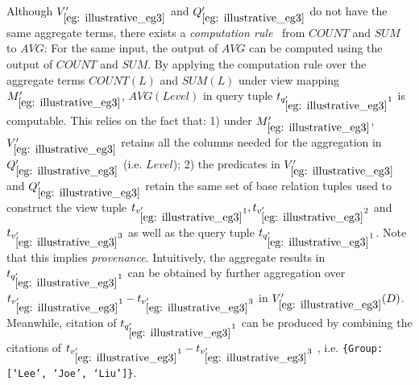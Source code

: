 \begin{example}
\begin{table}[htp]
\end{table}


Although $V_{\ref{eg: illustrative_eg3}}'$ and $Q_{\ref{eg: illustrative_eg3}}'$ do not have the same aggregate terms, there exists a \textit{computation rule}~\cite{cohen2006user} from $COUNT$ and $SUM$ to $AVG$:  For the same input, the output of $AVG$ can be computed using the output of $COUNT$ and $SUM$. By applying the computation rule over the aggregate terms $COUNT(L)$ and $SUM(L)$ under view mapping $M_{\ref{eg: illustrative_eg3}}'$, $AVG(Level)$ in query tuple $t_{q_{\ref{eg: illustrative_eg3}}'1}$ is computable. This relies on the fact that: 1) under $M_{\ref{eg: illustrative_eg3}}'$, $V_{\ref{eg: illustrative_eg3}}'$ retains all the columns needed for the aggregation in $Q_{\ref{eg: illustrative_eg3}}'$ (i.e. $Level$); 2) the predicates in $V_{\ref{eg: illustrative_eg3}}'$ and $Q_{\ref{eg: illustrative_eg3}}'$ retain the same set of base relation tuples used to construct the view tuple $t_{v_{\ref{eg: illustrative_eg3}}'1}, t_{v_{\ref{eg: illustrative_eg3}}'2}$ and $t_{v_{\ref{eg: illustrative_eg3}}'3}$ as well as the query tuple $t_{q_{\ref{eg: illustrative_eg3}}'1}$.  Note that this implies {\em provenance}. Intuitively, the aggregate results in $t_{q_{\ref{eg: illustrative_eg3}}'1}$ can be obtained by further aggregation over $t_{v_{\ref{eg: illustrative_eg3}}'1}-t_{v_{\ref{eg: illustrative_eg3}}'3}$ in $V_{\ref{eg: illustrative_eg3}}'(D)$. Meanwhile, citation of $t_{q_{\ref{eg: illustrative_eg3}}'1}$ can be produced by combining the citations of $t_{v_{\ref{eg: illustrative_eg3}}'1}-t_{v_{\ref{eg: illustrative_eg3}}'3}$ , i.e. {\tt \{Group: [`Lee', `Joe', `Liu']\}}.%


\end{example}

